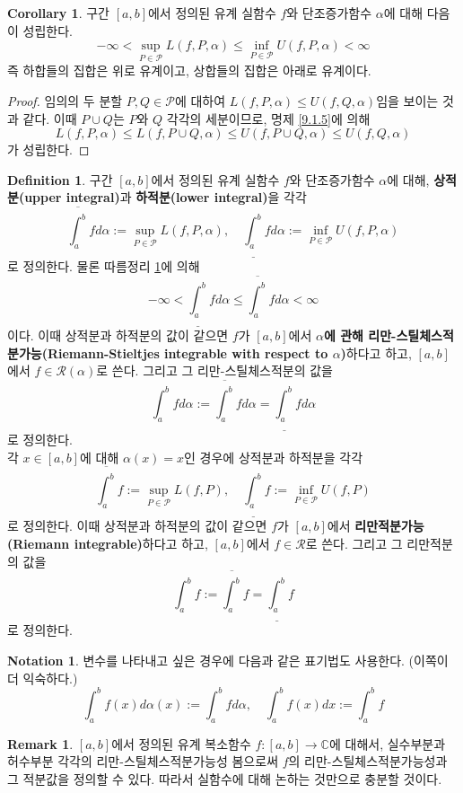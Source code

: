 \documentclass[11pt]{book}
\numberwithin{equation}{chapter}
\def\CC{\mathbb{C}}
\def\calP{\mathcal{P}}
\def\calR{\mathcal{R}}
\newcommand{\lowint}[2]{\underline{\int_{#1}^{#2}}}
\newcommand{\upint}[2]{\overline{\int_{#1}^{#2}}}
\theoremstyle{definition}
\newtheorem{cor}[thm]{Corollary}
\newtheorem{defn}[thm]{Definition}
\newtheorem{notn}[thm]{Notation}
\newtheorem*{rem}{Remark}
\begin{document}
\begin{cor} \label{9.1.6}
    구간 \([a, b]\)에서 정의된 유계 실함수 \(f\)와 단조증가함수 \(\alpha\)에 대해 다음이 성립한다.
    \[
        - \infty < \sup_{P \in \calP} L(f, P, \alpha) \le \inf_{P \in \calP} U(f, P, \alpha) < \infty
    \]
    즉 하합들의 집합은 위로 유계이고, 상합들의 집합은 아래로 유계이다.
\end{cor}
\begin{proof}
    임의의 두 분할 \(P, Q \in \calP\)에 대하여 \(L(f, P, \alpha) \le U(f, Q, \alpha)\)임을 보이는 것과 같다. 이때 \(P \cup Q\)는 \(P\)와 \(Q\) 각각의 세분이므로, 명제 \ref{9.1.5}에 의해
    \[
        L(f, P, \alpha) \le L(f, P \cup Q, \alpha) \le U(f, P \cup Q, \alpha) \le U(f, Q, \alpha)
    \]
    가 성립한다.
\end{proof}

\begin{defn}
    구간 \([a, b]\)에서 정의된 유계 실함수 \(f\)와 단조증가함수 \(\alpha\)에 대해, \textbf{상적분(upper integral)}과 \textbf{하적분(lower integral)}을 각각
    \[
        \upint{a}{b} f d\alpha := \sup_{P \in \calP} L(f, P, \alpha), \quad \lowint{a}{b} f d\alpha := \inf_{P \in \calP} U(f, P, \alpha)
    \]
    로 정의한다. 물론 따름정리 \ref{9.1.6}에 의해
    \[
        -\infty < \lowint{a}{b} f d\alpha \le \upint{a}{b} f d\alpha < \infty
    \]
    이다. 이때 상적분과 하적분의 값이 같으면 \(f\)가 \([a, b]\)에서 \textbf{\(\alpha\)에 관해 리만-스틸체스적분가능(Riemann-Stieltjes integrable with respect to \(\alpha\))}하다고 하고, \([a, b]\)에서 \(f \in \calR(\alpha)\)로 쓴다. 그리고 그 리만-스틸체스적분의 값을
    \[
        \int_a^b f d\alpha := \upint{a}{b} f d\alpha = \lowint{a}{b} f d\alpha
    \]
    로 정의한다.\\
    각 \(x \in [a, b]\)에 대해 \(\alpha(x) = x\)인 경우에 상적분과 하적분을 각각
    \[
        \upint{a}{b} f := \sup_{P \in \calP} L(f, P), \quad \lowint{a}{b} f := \inf_{P \in \calP} U(f, P)
    \]
    로 정의한다. 이때 상적분과 하적분의 값이 같으면 \(f\)가 \([a, b]\)에서 \textbf{리만적분가능(Riemann integrable)}하다고 하고, \([a, b]\)에서 \(f \in \calR\)로 쓴다. 그리고 그 리만적분의 값을
    \[
        \int_a^b f := \upint{a}{b} f = \lowint{a}{b} f 
    \]
    로 정의한다.
\end{defn}
\begin{notn}
    변수를 나타내고 싶은 경우에 다음과 같은 표기법도 사용한다. (이쪽이 더 익숙하다.)
    \[
        \int_a^b f(x) d\alpha(x) := \int_a^b f d\alpha, \quad \int_a^b f(x) dx := \int_a^b f
    \]
\end{notn}
\begin{rem}
    \([a, b]\)에서 정의된 유계 복소함수 \(f : [a, b] \to \CC\)에 대해서, 실수부분과 허수부분 각각의 리만-스틸체스적분가능성 봄으로써 \(f\)의 리만-스틸체스적분가능성과 그 적분값을 정의할 수 있다. 따라서 실함수에 대해 논하는 것만으로 충분할 것이다.
\end{rem}
\end{document}
